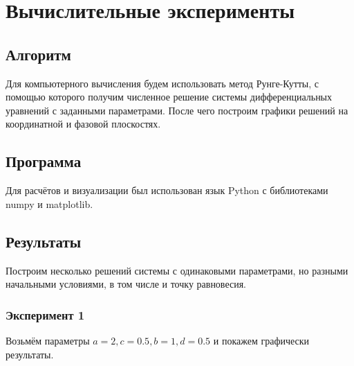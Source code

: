 \section{Вычислительные эксперименты}

    \subsection{Алгоритм}
        Для компьютерного вычисления будем использовать метод Рунге-Кутты, с помощью которого получим численное решение системы дифференциальных уравнений с заданными параметрами. После чего построим графики решений на координатной и фазовой плоскостях.


    \subsection{Программа}
        Для расчётов и визуализации был использован язык Python с библиотеками numpy и matplotlib.

        

    \subsection{Результаты}
        Построим несколько решений системы с одинаковыми параметрами, но разными начальными условиями, в том числе и точку равновесия.

        \subsubsection{Эксперимент 1}
        Возьмём параметры $a = 2, c = 0.5, b = 1, d = 0.5$ и покажем графически результаты.

